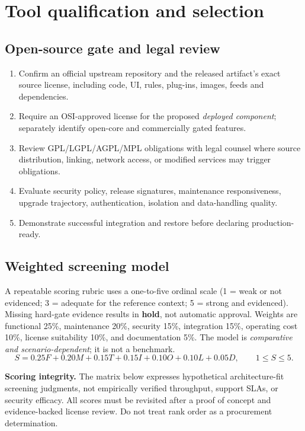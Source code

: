 \documentclass[11pt,oneside]{report}
\newcommand{\term}[1]{\textsf{\textbf{#1}}}
\begin{document}
\chapter{Tool qualification and selection}
\section{Open-source gate and legal review}
\begin{enumerate}[leftmargin=1.6em]
\item Confirm an official upstream repository and the released artifact's exact source license, including code, UI, rules, plug-ins, images, feeds and dependencies.
\item Require an OSI-approved license for the proposed \emph{deployed component}; separately identify open-core and commercially gated features.
\item Review GPL/LGPL/AGPL/MPL obligations with legal counsel where source distribution, linking, network access, or modified services may trigger obligations.
\item Evaluate security policy, release signatures, maintenance responsiveness, upgrade trajectory, authentication, isolation and data-handling quality.
\item Demonstrate successful integration and restore before declaring production-ready.
\end{enumerate}
\section{Weighted screening model}
A repeatable scoring rubric uses a one-to-five ordinal scale (1 = weak or not evidenced; 3 = adequate for the reference context; 5 = strong and evidenced). Missing hard-gate evidence results in \term{hold}, not automatic approval. Weights are functional 25\%, maintenance 20\%, security 15\%, integration 15\%, operating cost 10\%, license suitability 10\%, and documentation 5\%. The model is \emph{comparative and scenario-dependent}; it is not a benchmark.
\[
S=0.25F+0.20M+0.15T+0.15I+0.10O+0.10L+0.05D,
\qquad 1 \le S \le 5.
\]
\begin{caution}
\textbf{Scoring integrity.} The matrix below expresses hypothetical architecture-fit screening judgments, not empirically verified throughput, support SLAs, or security efficacy. All scores must be revisited after a proof of concept and evidence-backed license review. Do not treat rank order as a procurement determination.
\end{caution}
\end{document}
